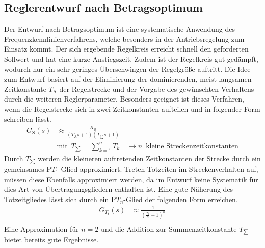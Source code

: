 \subsection{Reglerentwurf nach Betragsoptimum} 
%
Der Entwurf nach Betragsoptimum ist eine systematische Anwendung des Frequenzkennlinienverfahrens, welche besonders in der Antriebsregelung zum Einsatz kommt.  Der sich ergebende Regelkreis erreicht schnell den geforderten Sollwert und hat eine kurze Anstiegszeit. Zudem ist der Regelkreis gut gedämpft, wodurch nur ein sehr geringes Überschwingen der Regelgröße auftritt. Die Idee zum Entwurf basiert auf der Eliminierung der dominierenden, meist langsamen Zeitkonstante $T_{\text{A}}$ der Regelstrecke und der Vorgabe des gewünschten Verhaltens durch die weiteren Reglerparameter. Besonders geeignet ist dieses Verfahren, wenn die Regelstrecke sich in zwei Zeitkonstanten aufteilen und in folgender Form schreiben lässt.
%
\begin{equation}
\begin{aligned}
%
G_{\text{S}}(s)&\approx \frac{K_{\text{S}}}{\left(T_{\text{A}}s+1\right)\left(T_{\sum}s+1\right)}\\
%
&\text{mit}\,\,\,T_{\sum}=\sum_{k=1}^{n}T_{k}\quad \rightarrow n\,\,\,\text{kleine Streckenzeitkonstanten}\label{eq:summezeit}
%
\end{aligned}
\end{equation}
%
Durch $T_{\sum}$ werden die kleineren auftretenden Zeitkonstanten der Strecke durch ein gemeinsames P$T_{1}$-Glied approximiert. Treten Totzeiten im Streckenverhalten auf, müssen diese Ebenfalls approximiert werden, da im Entwurf keine Systematik für dies Art von Übertragungsgliedern enthalten ist. Eine gute Näherung des Totzeitgliedes lässt sich durch ein P$T_{n}$-Glied der folgenden Form erreichen.
%
\begin{equation*}
\begin{aligned}
%
G_{T_{\text{t}}}(s)&\approx \frac{1}{\left(\frac{T_{\text{t}}}{n}+1\right)^{n}}\\
%
\end{aligned}
\end{equation*}
%
Eine Approximation für $n=2$ und die Addition zur Summenzeitkonstante $T_{\sum}$ bietet bereits gute Ergebnisse.\\

